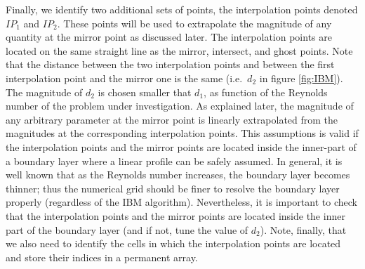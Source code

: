 \documentclass[review]{elsarticle}
\begin{document}
Finally, we identify two additional sets of points, the interpolation points denoted $IP_1$ and $IP_2$. These points will be used to extrapolate the magnitude of any quantity at the mirror point as discussed later. The interpolation points are located on the same straight line as  the mirror, intersect, and ghost points. 
Note that the distance between the two interpolation points and between the first interpolation point and the mirror one is the same (i.e.\ $d_2$ in figure \ref{fig:IBM}). 
The magnitude of $d_2$ is chosen smaller that $d_1$, as function of the Reynolds number of the problem under investigation. As explained later, the magnitude of any arbitrary parameter at the mirror point is linearly extrapolated from the magnitudes at the corresponding interpolation points. This assumptions is valid if the interpolation points and the mirror points are located inside the inner-part of a boundary layer where a linear profile can be safely assumed. 
In general, it is well known that as the Reynolds number increases, the boundary layer becomes thinner; thus the numerical grid should be finer to resolve the boundary layer properly (regardless of the IBM algorithm). Nevertheless, it is important to check that the interpolation points and the mirror points are located inside the inner part of the boundary layer %
(and if not, tune the value of $d_2$).
Note, finally, that we also need to identify the cells in which the interpolation points are located and store their indices in a permanent array.
\end{document}
